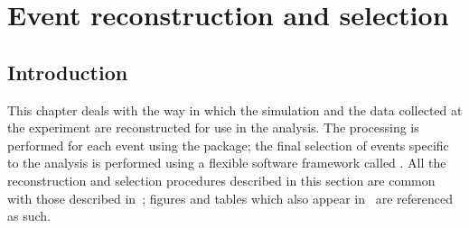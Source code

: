 \chapter{Event reconstruction and selection}
\label{chap:reconstruction}


\section{Introduction}
\label{reco:sec:intro}

This chapter deals with the way in which the simulation and the data collected at the \CMS experiment are reconstructed for use in the \Hgg analysis. 
The processing is performed for each event using the \CMSSW package; the final selection of events specific to the \Hgg analysis is performed using a flexible software framework called \FLASHgg. %
All the reconstruction and selection procedures described in this section are common with those described in~\cite{CMS-PAS-HIG-16-020}; figures and tables which also appear in~\cite{CMS-PAS-HIG-16-020} are referenced as such.

